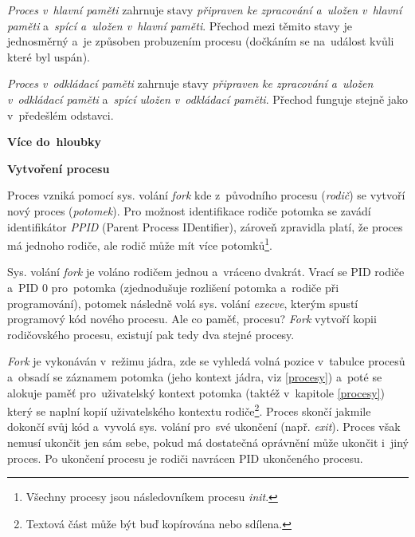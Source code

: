 \emph{Proces v~hlavní paměti} zahrnuje stavy \emph{připraven ke zpracování a~uložen v~hlavní paměti} a~\emph{spící a~uložen v~hlavní paměti}. Přechod mezi těmito stavy je jednosměrný a~je způsoben probuzením procesu (dočkáním se na~událost kvůli které byl uspán).

\vspace{0,5cm}

\emph{Proces v~odkládací paměti} zahrnuje stavy \emph{připraven ke zpracování a~uložen v~odkládací paměti} a~\emph{spící uložen v~odkládací paměti}. Přechod funguje stejně jako v~předešlém odstavci. 

\begin{Large}
    \vspace{0,5cm}    
    \textbf{Více do~hloubky}
\end{Large}

\begin{large}
    \vspace{0,5cm}
    \textbf{Vytvoření procesu}
\end{large}

Proces vzniká pomocí sys. volání \emph{fork} kde z~původního procesu (\emph{rodič}) se vytvoří nový proces (\emph{potomek}). Pro možnost identifikace rodiče potomka se zavádí identifikátor \emph{PPID} (Parent Process IDentifier), zároveň zpravidla platí, že proces má jednoho rodiče, ale rodič může mít více potomků\footnote{Všechny procesy jsou následovníkem procesu \emph{init}.}. 

\vspace{0,5cm}

Sys. volání \emph{fork} je voláno rodičem jednou a~vráceno dvakrát. Vrací se PID rodiče a~PID 0 pro~potomka (zjednodušuje rozlišení potomka a~rodiče při programování), potomek následně volá sys. volání \emph{execve}, kterým spustí programový kód nového procesu. Ale co paměť, procesu? \emph{Fork} vytvoří kopii rodičovského procesu, existují pak tedy dva stejné procesy.

\vspace{0,5cm}

\emph{Fork} je vykonáván v~režimu jádra, zde se vyhledá volná pozice v~tabulce procesů a~obsadí se záznamem potomka (jeho kontext jádra, viz \ref{procesy}) a~poté se alokuje paměť pro~uživatelský kontext potomka (taktéž v~kapitole \ref{procesy}) který se naplní kopií uživatelského kontextu rodiče\footnote{Textová část může být buď kopírována nebo sdílena.}. Proces skončí jakmile dokončí svůj kód a~vyvolá sys. volání pro~své ukončení (např. \emph{exit}). Proces však nemusí ukončit jen sám sebe, pokud má dostatečná oprávnění může ukončit i~jiný proces. Po ukončení procesu je rodiči navrácen PID ukončeného procesu. 

